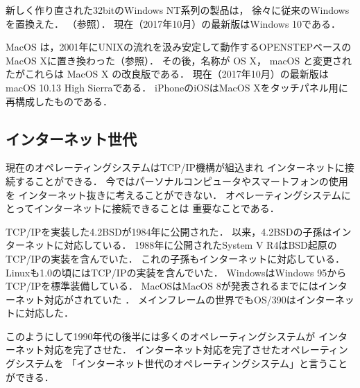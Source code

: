 \begin{enumerate}
\begin{itemize}
      新しく作り直された32bitのWindows NT系列の製品は，
      徐々に従来のWindowsを置換えた．
      （参照）．
      現在（2017年10月）の最新版はWindows 10である．

      MacOS は，2001年にUNIXの流れを汲み安定して動作するOPENSTEPベースの
      MacOS X\cite{macos}に置き換わった（参照）．
      その後，名称が OS X， macOS と変更されたがこれらは MacOS X の改良版である．
      現在（2017年10月）の最新版はmacOS 10.13 High Sierraである．
      iPhoneのiOSはMacOS Xをタッチパネル用に再構成したものである\cite{ios}．
    \end{itemize}
\end{enumerate}

\subsection{インターネット世代}
現在のオペレーティングシステムはTCP/IP機構が組込まれ
インターネットに接続することができる．
今ではパーソナルコンピュータやスマートフォンの使用を
インターネット抜きに考えることができない．
オペレーティングシステムにとってインターネットに接続できることは
重要なことである．

TCP/IPを実装した4.2BSDが1984年に公開された\cite{bsd}．
以来，4.2BSDの子孫はインターネットに対応している．
1988年に公開されたSystem V R4はBSD起原のTCP/IPの実装を含んでいた\cite{svr4}．
これの子孫もインターネットに対応している．
Linuxも1.0の頃にはTCP/IPの実装を含んでいた\cite{linux1}．
WindowsはWindows 95からTCP/IPを標準装備している\cite{windows}．
MacOSはMacOS 8が発表されるまでにはインターネット対応がされていた
\cite{classicmacos}．
メインフレームの世界でもOS/390はインターネットに対応した\cite{os390}．

このようにして1990年代の後半には多くのオペレーティングシステムが
インターネット対応を完了させた．
インターネット対応を完了させたオペレーティングシステムを
「インターネット世代のオペレーティングシステム」と言うことができる．

